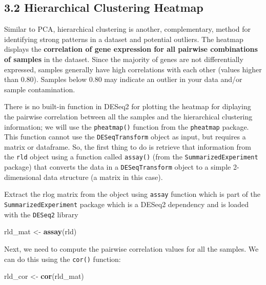 \documentclass[
]{article}
\newenvironment{Shaded}{\begin{snugshade}}{\end{snugshade}}
\newcommand{\FunctionTok}[1]{\textcolor[rgb]{0.13,0.29,0.53}{\textbf{#1}}}
\newcommand{\NormalTok}[1]{#1}
\newcommand{\OtherTok}[1]{\textcolor[rgb]{0.56,0.35,0.01}{#1}}
\begin{document}
\subsection{3.2 Hierarchical Clustering
Heatmap}\label{hierarchical-clustering-heatmap}

Similar to PCA, hierarchical clustering is another, complementary,
method for identifying strong patterns in a dataset and potential
outliers. The heatmap displays the \textbf{correlation of gene
expression for all pairwise combinations of samples} in the dataset.
Since the majority of genes are not differentially expressed, samples
generally have high correlations with each other (values higher than
0.80). Samples below 0.80 may indicate an outlier in your data and/or
sample contamination.

There is no built-in function in DESeq2 for plotting the heatmap for
diplaying the pairwise correlation between all the samples and the
hierarchical clustering information; we will use the \texttt{pheatmap()}
function from the \texttt{pheatmap} package. This function cannot use
the \texttt{DESeqTransform} object as input, but requires a matrix or
dataframe. So, the first thing to do is retrieve that information from
the \texttt{rld} object using a function called \texttt{assay()} (from
the \texttt{SummarizedExperiment} package) that converts the data in a
\texttt{DESeqTransform} object to a simple 2-dimensional data structure
(a matrix in this case).

Extract the rlog matrix from the object using \texttt{assay} function
which is part of the \texttt{SummarizedExperiment} package which is a
DESeq2 dependency and is loaded with the \texttt{DESeq2} library

\begin{Shaded}
\begin{Highlighting}[]
\NormalTok{rld\_mat }\OtherTok{\textless{}{-}} \FunctionTok{assay}\NormalTok{(rld)}
\end{Highlighting}
\end{Shaded}

Next, we need to compute the pairwise correlation values for all the
samples. We can do this using the \texttt{cor()} function:

\begin{Shaded}
\begin{Highlighting}[]
\NormalTok{rld\_cor }\OtherTok{\textless{}{-}} \FunctionTok{cor}\NormalTok{(rld\_mat) }
\end{Highlighting}
\end{Shaded}
\end{document}
